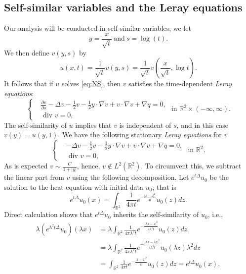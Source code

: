\documentclass[12pt]{amsart}
\numberwithin{equation}{section}              %
\theoremstyle{remark}
\begin{document}
	\subsection{Self-similar variables and the Leray equations}\label{sec:Lerayeq}
	Our analysis will be conducted in self-similar variables; we let
	\begin{equation}\label{eq:changeofvaribales}
		y=\frac{x}{\sqrt{t}} ~\textrm{and}~ s=\log (t).
	\end{equation}
	We then define   $v(y,s)$  by
	\begin{equation}\label{eq:changeofvareq}
		u(x,t)=\frac{1}{\sqrt{t}}v(y,s) = \frac{1}{\sqrt{t}}v\left(\frac{x}{\sqrt{t}},\log t\right).
	\end{equation}
	It follows that if $u$ solves \eqref{eq:NS}, then $v$ satisfies the time-dependent \emph{Leray equations}:
	\begin{equation}\label{eq:Leray}
		\left\{
		\begin{aligned}
			&\frac{\partial v}{\partial s}-\Delta v -\frac{1}{2}v -\frac{1}{2}y\cdot \nabla v+ v\cdot \nabla v +\nabla q=0,\\
			&\textrm{ div } v=0,
		\end{aligned}
		\right. \textrm{ in } \mathbb{R}^2\times (-\infty,\infty).
	\end{equation}
	The self-similarity of $u$ implies that $v$ is independent of $s$, and in this case
	$v(y)=u(y,1)$. We have the following stationary \emph{Leray equations} for $v$
	\begin{equation}\label{eq:NSinself-similar}
		\left\{
		\begin{aligned}
			&-\Delta v -\frac{1}{2}v -\frac{1}{2}y\cdot \nabla v+ v\cdot \nabla v +\nabla q=0,\\
			&\textrm{ div } v=0,
		\end{aligned}
		\right. \textrm{ in } \mathbb{R}^2.
	\end{equation}
	As is expected $ v\sim \frac{C}{1+|y|}$, hence, $ v\notin L^2(\mathbb{R}^2)$. 
	To circumvent this, we subtract the linear part from $v$ using the following decomposition.
	Let $ e^{t\Delta}u_0$ be the solution to the heat equation with initial data $u_0$, that  is 
	\begin{equation*}
		e^{t\Delta}u_0(x) =\int_{\mathbb{R}^2} \frac{1}{4\pi t}e^{-\frac{|x-z|^2}{4 t}}u_0(z)dz.
	\end{equation*}
	Direct calculation shows that $e^{t\Delta}u_0$ inherits the self-similarity of $u_0$, i.e.,
	\begin{equation*}
		\begin{aligned}
			\lambda  (e^{\lambda^2 t\Delta}u_0) (\lambda x) & = \lambda\int_{\mathbb{R}^2} \frac{1}{4\pi \lambda^2 t}e^{-\frac{|\lambda x- z|^2}{4 \lambda^2 t}}u_0(z)dz\\
			&=\lambda\int_{\mathbb{R}^2} \frac{1}{4\pi \lambda^2 t}e^{-\frac{|\lambda x- \lambda z|^2}{4 \lambda^2 t}}u_0(\lambda z)\lambda^{2} dz\\
			&=\int_{\mathbb{R}^2} \frac{1}{4\pi  t}e^{-\frac{| x-  z|^2}{4 t}}u_0( z) dz= e^{t\Delta}u_0(x),
		\end{aligned}
	\end{equation*}
\end{document}
